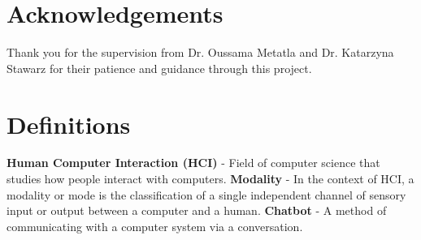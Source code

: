 
\section*{Acknowledgements}

Thank you for the supervision from Dr. Oussama Metatla and Dr. Katarzyna Stawarz for their patience and guidance through this project.


\section*{Definitions}
\textbf{Human Computer Interaction (HCI)} - Field of computer science that studies how people interact with computers.\newline
\newline
\textbf{Modality} - In the context of HCI, a modality or mode is the classification of a single independent channel of sensory input or output between a computer and a human.\newline
\newline
\textbf{Chatbot} - A method of communicating with a computer system via a conversation.
